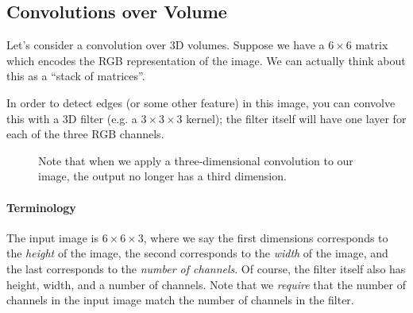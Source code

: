 \documentclass[12pt]{article}
\begin{document}
\subsection{Convolutions over Volume} Let's consider a convolution over 3D volumes. Suppose we have a $6 \times 6$ matrix
which encodes the RGB representation of the image. We can actually think about this as a ``stack of matrices''.

\begin{figure}[h]   \centering
   \end{figure}

In order to detect edges (or some other feature) in this image, you can convolve this with a 3D filter (e.g. a $3 \times 3 \times 3$ kernel); the filter itself will have one layer for each of the three RGB channels.

\begin{figure}[h]   
  \centering
  \caption{Note that when we apply a three-dimensional convolution to our image, the output no longer has a third dimension.}
\end{figure}

\paragraph{Terminology} The input image is $6 \times 6 \times 3$, where we say the first dimensions corresponds to the \emph{height}
of the image, the second corresponds to the \emph{width} of the image, and the last corresponds to the \emph{number of channels}. 
Of course, the filter itself also has height, width, and a number of channels.  Note that we \emph{require} that the number
of channels in the input image match the number of channels in the filter.
\end{document}
